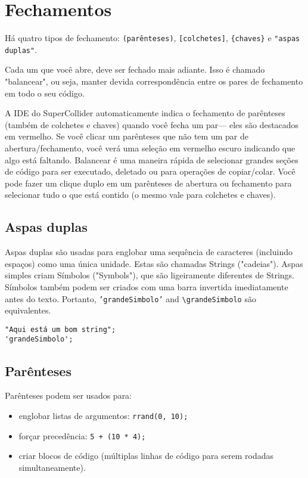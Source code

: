 \section{Fechamentos}

Há quatro tipos de fechamento: \texttt{(parênteses)}, \texttt{[colchetes]}, \texttt{\{chaves\}} e \texttt{"aspas duplas"}.

Cada um que você abre, deve ser fechado mais adiante. Isso é chamado "balancear", ou seja, manter devida correspondência entre os pares de fechamento em todo o seu código.

A IDE do SuperCollider automaticamente indica o fechamento de parênteses (também de colchetes e chaves) quando você fecha um par--- eles são destacados em vermelho. Se você clicar um parênteses que não tem um par de abertura/fechamento, você verá uma seleção em vermelho escuro indicando que algo está faltando. Balancear é uma maneira rápida de selecionar grandes seções de código para ser executado, deletado ou para operações de copiar/colar. Você pode fazer um clique duplo em um parênteses de abertura ou fechamento para selecionar tudo o que está contido (o mesmo vale para colchetes e chaves).

\subsection{Aspas duplas}

Aspas duplas são usadas para englobar uma sequência de caracteres (incluindo espaços) como uma única unidade. Estas são chamadas Strings ("cadeias"). Aspas simples criam Símbolos ("Symbols"), que são ligeiramente diferentes de Strings. Símbolos também podem ser criados com uma barra invertida imediatamente antes do texto. Portanto, \texttt{'grandeSimbolo'} and \texttt{\textbackslash grandeSimbolo} são equivalentes.

\begin{lstlisting}[style=SuperCollider-IDE, basicstyle=\scttfamily\footnotesize]
"Aqui está um bom string";
'grandeSimbolo';
\end{lstlisting}

\subsection{Parênteses}

Parênteses podem ser usados para:

\begin{itemize}
\item englobar listas de argumentos: \texttt{rrand(0, 10);}
\item forçar precedência: \texttt{5 + (10 * 4);}
\item criar blocos de código (múltiplas linhas de código para serem rodadas simultaneamente).
\end{itemize} 

